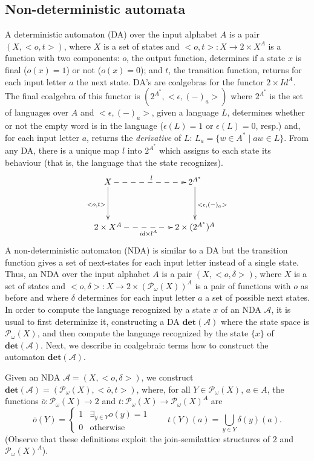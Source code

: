 \documentclass{LMCS}
\def\pow#1{{\mathcal P_\omega}#1}
\begin{document}
\subsection{Non-deterministic automata}
A deterministic automaton (DA) over the input alphabet $A$ is a pair
$(X,<o,t>)$, where $X$ is a set of states and $<o,t> \colon X \to
2\times X^A$ is a function with two components: $o$, the output
function, determines if a state $x$ is final ($o(x) = 1$) or not
($o(x) = 0$); and $t$, the transition function, returns for each
input letter $a$ the next state. DA's are coalgebras for the functor
$2\times \mathit{Id}^A$. The final coalgebra of this functor is
$(2^{A^*},<\epsilon, (-)_a>)$ where $2^{A^*}$ is the set of
languages over $A$ and $<\epsilon, (-)_a>$, given a language $L$,
determines whether or not the empty word is in the language
($\epsilon(L) =1$ or $\epsilon(L)=0$, resp.) and, for each input
letter $a$, returns the {\em derivative} of $L$: $L_a = \{ w \in A^*
\mid aw\in L\}$.
From any DA, there is a unique map $l$ into $2^{A^*}$ which assigns
to each state its behaviour (that is, the language that the state
recognizes).
\[
\xymatrix@C=2cm@R=1.3cm{X \ar@{-->}[r]^{l}\ar[d]_{<o,t>} &
2^{A^*}\ar[d]^{<\epsilon, (-)_a>}\\
2\times X^A\ar@{-->}[r]_-{\mathit{id}\times l^A} & 2\times (2^{A^*})^A }
\]
A non-deterministic automaton (NDA) is similar to a DA but the
transition function gives a set of next-states for each input letter
instead of a single state. Thus, an NDA over the input alphabet $A$
is a pair $(X,<o,\delta>)$, where $X$ is a set of states and
$<o,\delta> \colon X \to 2\times (\pow(X))^A$ is a pair of functions
with $o$ as before and where $\delta$ determines for each input
letter $a$ a set of possible next states. In order to compute the
language recognized by a state $x$ of an NDA $\mathcal A$, it is
usual to first determinize it, constructing a DA
$\mathbf{det}(\mathcal A)$ where the state space is $\pow(X)$, and
then compute the language recognized by the state $\{x\}$ of
$\mathbf{det}(\mathcal A)$. Next, we describe in coalgebraic terms
how to construct the automaton $\mathbf{det}(\mathcal A)$.

Given an NDA $\mathcal A = (X, <o,\delta>)$, we construct
$\mathbf{det}(\mathcal A) = (\pow(X), <\overline o,t>)$, where, for
all $Y\in \pow(X)$, $a\in A$, the functions $\overline o\colon\pow(X) \to
2$ and $t\colon\pow(X) \to \pow(X)^A$ are
$$\overline o (Y) = \begin{cases} 1 & \exists_{y\in Y}
o(y) =1\\ 0 &\text{otherwise}\end{cases} \qquad t(Y)(a) =
\bigcup\limits_{y\in Y}\delta(y)(a)\text{.}$$ 
(Observe that these definitions exploit the join-semilattice structures of $2$ and $\pow(X)^A$).
\end{document}
